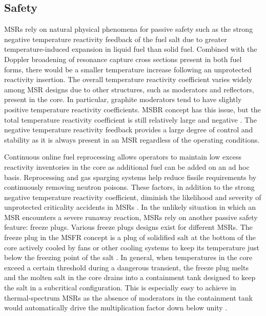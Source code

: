 \subsection{Safety}

\glspl{MSR} rely on natural physical phenomena for passive safety such as the
strong negative temperature reactivity feedback of the fuel salt due to
greater temperature-induced expansion in liquid fuel than solid
fuel. Combined with the Doppler broadening of resonance capture cross sections
present in both fuel forms, there would be a smaller temperature
increase following an unprotected reactivity insertion. The overall
temperature reactivity coefficient varies widely among \gls{MSR}
designs due to other structures, such as moderators and reflectors, present in
the core. In particular, graphite moderators tend to have slightly positive
temperature reactivity coefficients. \gls{MSBR} concept has this issue, but
the total temperature reactivity coefficient is still relatively large and
negative \cite{rykhlevskii_modeling_2019}. The negative temperature reactivity
feedback provides a large degree of control and stability as it is always
present in an \gls{MSR} regardless of the operating conditions.

Continuous online fuel reprocessing allows operators to maintain low excess
reactivity inventories in the core as additional fuel can be added on an ad
hoc basis. Reprocessing and gas sparging systems help reduce fissile
requirements by continuously removing neutron poisons. These factors, in
addition to the strong negative temperature
reactivity coefficient, diminish the likelihood and severity of unprotected
criticality accidents in \glspl{MSR} \cite{elsheikh_safety_2013}. In the
unlikely situation in which an \gls{MSR} encounters a severe runaway reaction,
\glspl{MSR} rely on another passive safety feature: freeze plugs. Various
freeze plugs designs exist for different \glspl{MSR}. The freeze plug
in the \gls{MSFR} concept is a plug of solidified salt at the bottom of the
core actively cooled by fans or other cooling systems to keep its temperature
just below the freezing point of the salt \cite{aji_experimental_2020}. In
general, when temperatures in the core exceed a certain threshold during a
dangerous transient, the freeze plug melts and the molten salt in the core
drains into a containment tank designed to keep the salt in a subcritical
configuration. This is especially easy to achieve in thermal-spectrum
\glspl{MSR} as the absence of moderators in the containment tank would
automatically drive the multiplication factor down below unity
\cite{elsheikh_safety_2013}.

